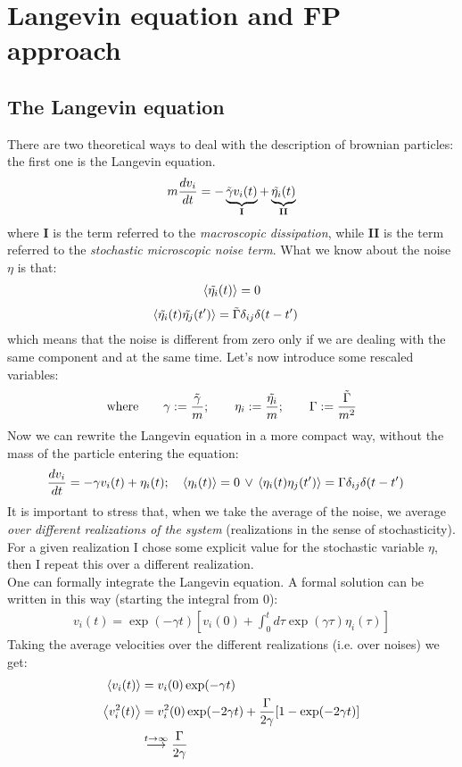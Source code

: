 \documentclass[\main/main.tex]{subfiles}
\begin{document}
\section{Langevin equation and FP approach}
\subsection{The Langevin equation}
There are two theoretical ways to deal with the description of brownian particles: the first one is the Langevin equation.
\begin{eqnarray}
m\frac{dv_i}{dt}=-\underbrace{\Tilde{\gamma}v_i(t)}_{\text{\textbf{I}}}+\underbrace{\Tilde{\eta_i}(t)}_\text{\textbf{II}}
\end{eqnarray}
where \textbf{I} is the term referred to the \textit{macroscopic dissipation}, while \textbf{II} is the term referred to the \textit{stochastic microscopic noise term}.
What we know about the noise $\eta$ is that:
\begin{eqnarray}
\left\langle \Tilde{\eta_i}(t) \right\rangle = 0 
\end{eqnarray}
\begin{eqnarray}
\left\langle \Tilde{\eta_i}(t)\Tilde{\eta_j}(t') \right\rangle &= \Tilde{\Gamma} \delta_{ij}\delta(t-t') 
\end{eqnarray}
which means that the noise is different from zero only if we are dealing with the same component and at the same time. Let's now introduce some rescaled variables:
\begin{eqnarray}
\text{where} \qquad \gamma:=\frac{\Tilde{\gamma}}{m}; \qquad \eta_i:= \frac{\Tilde{\eta_i}}{m}; \qquad \Gamma:=\frac{\Tilde{\Gamma}}{m^2}
\end{eqnarray}
Now we can rewrite the Langevin equation in a more compact way, without the mass of the particle entering the equation:
\begin{eqnarray}
\frac{dv_i}{dt}=-\gamma v_i(t)+\eta_i(t); \quad \left\langle \eta_i(t) \right\rangle=0\,\vee\, \left\langle {\eta_i}(t){\eta_j}(t') \right\rangle &= {\Gamma} \delta_{ij}\delta(t-t') 
\end{eqnarray}
It is important to stress that, when we take the average of the noise, we average \textit{over different realizations of the system} (realizations in the sense of stochasticity).
For a given realization I chose some explicit value for the stochastic variable $\eta$, then I repeat this over a different realization. \\

One can formally integrate the Langevin equation. A formal solution can be written in this way (starting the integral from 0):
\begin{eqnarray}
v_i(t)=\exp(-\gamma t)[v_i(0)+\int_0^t d\tau \exp(\gamma \tau)\eta_i(\tau)]
\end{eqnarray}
Taking the average velocities over the different realizations (i.e. over noises) we get:
\begin{align}
    \left\langle v_i(t) \right\rangle&= v_i(0)\exp(-\gamma t) \\
    \left\langle v_i ^2(t) \right\rangle &= v_i ^2(0)\exp(-2\gamma t) + \frac{\Gamma}{2\gamma}[1-\exp(-2\gamma t)] \\
    &\overset{t\to \infty}{\longrightarrow}\frac{\Gamma}{2\gamma} \label{eq:miao}
\end{align}
\end{document}
